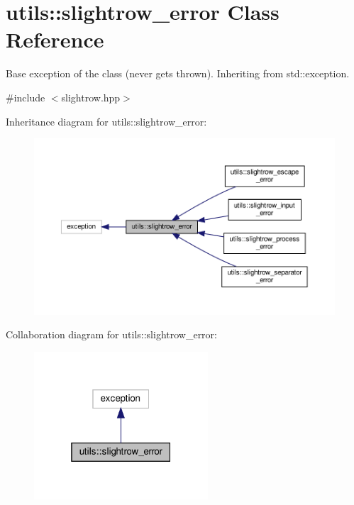 \hypertarget{classutils_1_1slightrow__error}{}\section{utils\+:\+:slightrow\+\_\+error Class Reference}
\label{classutils_1_1slightrow__error}


Base exception of the class (never gets thrown). Inheriting from std\+::exception.  




{\ttfamily \#include $<$slightrow.\+hpp$>$}



Inheritance diagram for utils\+:\+:slightrow\+\_\+error\+:\nopagebreak
\begin{figure}[H]
\begin{center}
\leavevmode
\includegraphics[width=350pt]{classutils_1_1slightrow__error__inherit__graph}
\end{center}
\end{figure}


Collaboration diagram for utils\+:\+:slightrow\+\_\+error\+:\nopagebreak
\begin{figure}[H]
\begin{center}
\leavevmode
\includegraphics[width=184pt]{classutils_1_1slightrow__error__coll__graph}
\end{center}
\end{figure}


